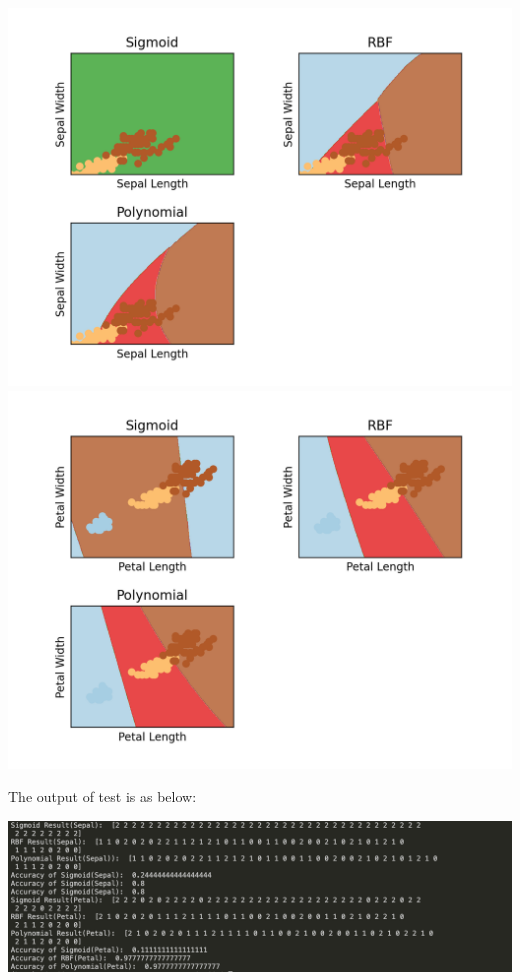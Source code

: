 \documentclass[12pt]{article}
\begin{document}
\begin{center}
    \includegraphics[scale=0.8]{fig/ec3.png}
    \includegraphics[scale=0.8]{fig/ec4.png} 
\end{center}
The output of test is as below: 
\begin{center}
    \includegraphics[scale=0.6]{fig/ec_output.png}
\end{center}
\end{document}
